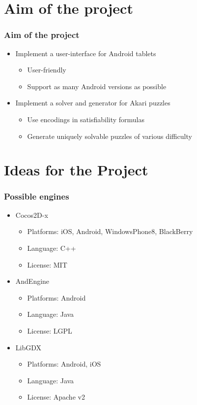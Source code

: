 \documentclass[xcolor=dvipsnames]{beamer}
\begin{document}
\section{Aim of the project}
\begin{frame}
  \frametitle{Aim of the project}
  \begin{itemize}
  \item Implement a user-interface for Android tablets
    \begin{itemize}
    \item User-friendly
    \item Support as many Android versions as possible
    \end{itemize}
  \item Implement a solver and generator for Akari puzzles
    \begin{itemize}
    \item Use encodings in satisfiability formulas
    \item Generate uniquely solvable puzzles of various difficulty 
    \end{itemize}
  \end{itemize}
\end{frame}

\section{Ideas for the Project}
\begin{frame}
  \frametitle{Possible engines}
  \begin{itemize}
  \item Cocos2D-x
    \begin{itemize}
    \item Platforms: iOS, Android, WindowsPhone8, BlackBerry
    \item Language: C++
    \item License: MIT
    \end{itemize}
  \item AndEngine
    \begin{itemize}
    \item Platforms: Android
    \item Language: Java
    \item License: LGPL
    \end{itemize}
  \item LibGDX
    \begin{itemize}
    \item Platforms: Android, iOS
    \item Language: Java
    \item License: Apache v2
    \end{itemize}
  \end{itemize}
\end{frame}
\end{document}
